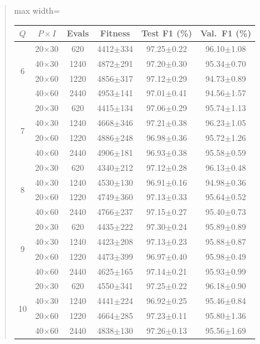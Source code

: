 \documentclass[11pt]{article}
\newenvironment{excerpt}{\begin{quote}\sloppy}{\end{quote}}
\begin{document}
\begin{excerpt}
\begin{table}[H]
\color{black}
\setlength{\tabcolsep}{3pt}
\begin{adjustbox}{max width=\linewidth}
\begin{tabular}{cccccc}
\hline\toprule
$Q$ & $P{\times}I$ & Evals & Fitness & Test F1 (\%) & Val.\ F1 (\%) \\
\hline\toprule
\multirow{4}{*}{6} & 20$\times$30 & 620 & 4412$\pm$334 & 97.25$\pm$0.22 & 96.10$\pm$1.08 \\
 & 40$\times$30 & 1240 & 4872$\pm$291 & 97.20$\pm$0.30 & 95.34$\pm$0.70 \\
 & 20$\times$60 & 1220 & 4856$\pm$317 & 97.12$\pm$0.29 & 94.73$\pm$0.89 \\
 & 40$\times$60 & 2440 & 4953$\pm$141 & 97.01$\pm$0.41 & 94.56$\pm$1.57 \\
\midrule
\multirow{4}{*}{7} & 20$\times$30 & 620 & 4415$\pm$134 & 97.06$\pm$0.29 & 95.74$\pm$1.13 \\
 & 40$\times$30 & 1240 & 4668$\pm$346 & 97.21$\pm$0.38 & 96.23$\pm$1.05 \\
 & 20$\times$60 & 1220 & 4886$\pm$248 & 96.98$\pm$0.36 & 95.72$\pm$1.26 \\
 & 40$\times$60 & 2440 & 4906$\pm$181 & 96.93$\pm$0.38 & 95.58$\pm$0.59 \\
\midrule
\multirow{4}{*}{8} & 20$\times$30 & 620 & 4340$\pm$212 & 97.12$\pm$0.28 & 96.13$\pm$0.48 \\
 & 40$\times$30 & 1240 & 4530$\pm$130 & 96.91$\pm$0.16 & 94.98$\pm$0.36 \\
 & 20$\times$60 & 1220 & 4749$\pm$360 & 97.13$\pm$0.33 & 95.64$\pm$0.52 \\
 & 40$\times$60 & 2440 & 4766$\pm$237 & 97.15$\pm$0.27 & 95.40$\pm$0.73 \\
\midrule
\multirow{4}{*}{9} & 20$\times$30 & 620 & 4435$\pm$222 & 97.30$\pm$0.24 & 95.89$\pm$0.89 \\
 & 40$\times$30 & 1240 & 4423$\pm$208 & 97.13$\pm$0.23 & 95.88$\pm$0.87 \\
 & 20$\times$60 & 1220 & 4473$\pm$399 & 96.97$\pm$0.40 & 95.98$\pm$0.49 \\
 & 40$\times$60 & 2440 & 4625$\pm$165 & 97.14$\pm$0.21 & 95.93$\pm$0.99 \\
\midrule
\multirow{4}{*}{10} & 20$\times$30 & 620 & 4550$\pm$341 & 97.25$\pm$0.22 & 96.18$\pm$0.90 \\
 & 40$\times$30 & 1240 & 4441$\pm$224 & 96.92$\pm$0.25 & 95.46$\pm$0.84 \\
 & 20$\times$60 & 1220 & 4664$\pm$285 & 97.23$\pm$0.11 & 95.80$\pm$1.36 \\
 & 40$\times$60 & 2440 & 4838$\pm$130 & 97.26$\pm$0.13 & 95.56$\pm$1.69 \\
\hline\toprule
\end{tabular}
\end{adjustbox}
\end{table}


\end{excerpt}
\end{document}
